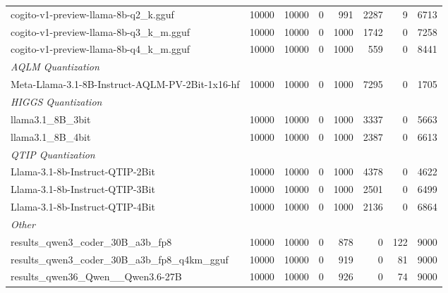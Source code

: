 \begin{table}[htbp]
{\begin{tabular}{lrrrrrrr}
    cogito-v1-preview-llama-8b-q2\_k.gguf & 10000 & 10000 & 0 & 991 & 2287 & 9 & 6713 \\
    cogito-v1-preview-llama-8b-q3\_k\_m.gguf & 10000 & 10000 & 0 & 1000 & 1742 & 0 & 7258 \\
    cogito-v1-preview-llama-8b-q4\_k\_m.gguf & 10000 & 10000 & 0 & 1000 & 559 & 0 & 8441 \\
    \midrule
    \multicolumn{8}{l}{\textit{AQLM Quantization}} \\
    \midrule
    Meta-Llama-3.1-8B-Instruct-AQLM-PV-2Bit-1x16-hf & 10000 & 10000 & 0 & 1000 & 7295 & 0 & 1705 \\
    \midrule
    \multicolumn{8}{l}{\textit{HIGGS Quantization}} \\
    \midrule
    llama3.1\_8B\_3bit & 10000 & 10000 & 0 & 1000 & 3337 & 0 & 5663 \\
    llama3.1\_8B\_4bit & 10000 & 10000 & 0 & 1000 & 2387 & 0 & 6613 \\
    \midrule
    \multicolumn{8}{l}{\textit{QTIP Quantization}} \\
    \midrule
    Llama-3.1-8b-Instruct-QTIP-2Bit & 10000 & 10000 & 0 & 1000 & 4378 & 0 & 4622 \\
    Llama-3.1-8b-Instruct-QTIP-3Bit & 10000 & 10000 & 0 & 1000 & 2501 & 0 & 6499 \\
    Llama-3.1-8b-Instruct-QTIP-4Bit & 10000 & 10000 & 0 & 1000 & 2136 & 0 & 6864 \\
    \midrule
    \multicolumn{8}{l}{\textit{Other}} \\
    \midrule
    results\_qwen3\_coder\_30B\_a3b\_fp8 & 10000 & 10000 & 0 & 878 & 0 & 122 & 9000 \\
    results\_qwen3\_coder\_30B\_a3b\_fp8\_q4km\_gguf & 10000 & 10000 & 0 & 919 & 0 & 81 & 9000 \\
    results\_qwen36\_Qwen\_\_Qwen3.6-27B & 10000 & 10000 & 0 & 926 & 0 & 74 & 9000 \\
    \bottomrule
  \end{tabular}
  }
\end{table}

